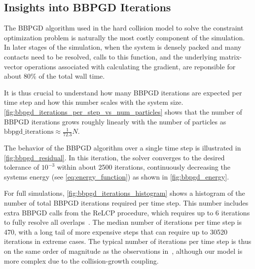 \documentclass[conference]{IEEEtran}
\begin{document}
\newpage


\subsection{Insights into BBPGD Iterations}

The BBPGD algorithm used in the hard collision model to solve the constraint optimization problem is naturally the most costly component of the simulation. In later stages of the simulation, when the system is densely packed and many contacts need to be resolved, calls to this function, and the underlying matrix-vector operations associated with calculating the gradient, are reponsible for about 80\% of the total wall time.

It is thus crucial to understand how many BBPGD iterations are expected per time step and how this number scales with the system size. \autoref{fig:bbpgd_iterations_per_step_vs_num_particles} shows that the number of BBPGD iterations grows roughly linearly with the number of particles as $\text{bbpgd\_iterations} \approx  \frac{1}{72.3} N$.

The behavior of the BBPGD algorithm over a single time step is illustrated in \autoref{fig:bbpgd_residual}. In this iteration, the solver converges to the desired tolerance of $10^{-3}$ within about 2500 iterations, continuously decreasing the systems energy (see \autoref{eq:energy_function}) as shown in \autoref{fig:bbpgd_energy}.

For full simulations, \autoref{fig:bbpgd_iterations_histogram} shows a histogram of the number of total BBPGD iterations required per time step. This number includes extra BBPGD calls from the ReLCP procedure, which requires up to 6 iterations to fully resolve all overlaps~\cite{Weady2024SM}. The median number of iterations per time step is 470, with a long tail of more expensive steps that can require up to 30520 iterations in extreme cases. The typical number of iterations per time step is thus on the same order of magnitude as the observations in~\cite{Yan2019}, although our model is more complex due to the collision-growth coupling.
\end{document}
